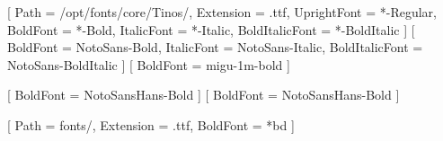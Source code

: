 \usepackage{fontspec}

\setmainfont{Tinos}[ %
  Path = /opt/fonts/core/Tinos/,
  Extension = .ttf,
  UprightFont = *-Regular,
  BoldFont = *-Bold,
  ItalicFont = *-Italic,
  BoldItalicFont = *-BoldItalic
]
\setsansfont{NotoSans}[ %
  BoldFont = NotoSans-Bold,
  ItalicFont = NotoSans-Italic,
  BoldItalicFont = NotoSans-BoldItalic  
]
\setmonofont{migu-1m-regular}[
  BoldFont = migu-1m-bold
]

%


\usepackage[boldfont]{xeCJK}
[ %
BoldFont = NotoSansHans-Bold %
]
[
  BoldFont = NotoSansHans-Bold
]

[ %
  Path = fonts/,
  Extension = .ttf,
  BoldFont = {*bd}
]


%


